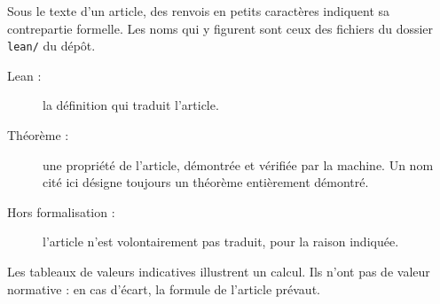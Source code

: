 \documentclass[11pt,a4paper]{article}
\newcounter{article}
\begin{document}
Sous le texte d'un article, des renvois en petits caractères indiquent sa
contrepartie formelle. Les noms qui y figurent sont ceux des fichiers du
dossier \texttt{lean/} du dépôt.
\begin{description}
  \item[\textsf{Lean :}] la définition qui traduit l'article.
  \item[\textsf{Théorème :}] une propriété de l'article, démontrée et vérifiée
    par la machine. Un nom cité ici désigne toujours un théorème entièrement
    démontré.
  \item[\textsf{Hors formalisation :}] l'article n'est volontairement pas
    traduit, pour la raison indiquée.
\end{description}
Les tableaux de valeurs indicatives illustrent un calcul. Ils n'ont pas de
valeur normative : en cas d'écart, la formule de l'article prévaut.





\end{document}
